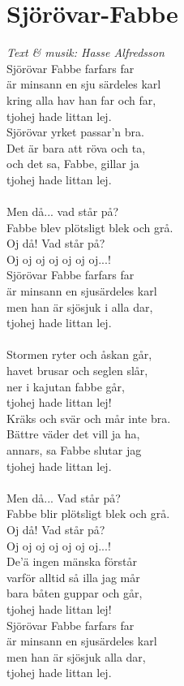 \section{Sjörövar-Fabbe}
\textit{Text \& musik: Hasse Alfredsson}
\vspace{2mm}\\
Sjörövar Fabbe farfars far\\
är minsann en sju särdeles karl\\
kring alla hav han far och far,\\
tjohej hade littan lej.\\
Sjörövar yrket passar'n bra.\\
Det är bara att röva och ta,\\
och det sa, Fabbe, gillar ja\\
tjohej hade littan lej.\\
\\
Men då... vad står på?\\
Fabbe blev plötsligt blek och grå.\\
Oj då! Vad står på?\\
Oj oj oj oj oj oj oj...!\\
\newpage
\noindent Sjörövar Fabbe farfars far\\
är minsann en sjusärdeles karl\\
men han är sjösjuk i alla dar,\\
tjohej hade littan lej.\\
\\
Stormen ryter och åskan går,\\
havet brusar och seglen slår,\\
ner i kajutan fabbe går,\\
tjohej hade littan lej!\\
Kräks och svär och mår inte bra.\\
Bättre väder det vill ja ha,\\
annars, sa Fabbe slutar jag\\
tjohej hade littan lej.\\
\\
Men då... Vad står på?\\
Fabbe blir plötsligt blek och grå.\\
Oj då! Vad står på?\\
Oj oj oj oj oj oj oj...!\\
De'ä ingen mänska förstår\\
varför alltid så illa jag mår\\
bara båten guppar och går,\\
tjohej hade littan lej!\\
Sjörövar Fabbe farfars far\\
är minsann en sjusärdeles karl\\
men han är sjösjuk alla dar,\\
tjohej hade littan lej.

